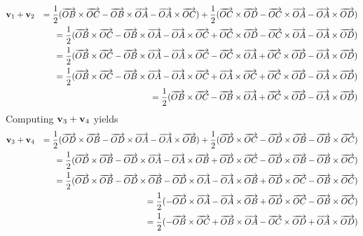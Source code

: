 \documentclass[12pt]{amsbook}
\begin{document}
\begin{eqnarray*}
{\bf v}_1+{\bf v}_2&&=\frac 12(\overrightarrow{OB}\times\overrightarrow{OC}-\overrightarrow{OB}\times\overrightarrow{OA}-\overrightarrow{OA}\times\overrightarrow{OC})+\frac 12(\overrightarrow{OC}\times\overrightarrow{OD}-\overrightarrow{OC}\times\overrightarrow{OA}-\overrightarrow{OA}\times\overrightarrow{OD})\\
&&=\frac 12(\overrightarrow{OB}\times\overrightarrow{OC}-\overrightarrow{OB}\times\overrightarrow{OA}-\overrightarrow{OA}\times\overrightarrow{OC}+\overrightarrow{OC}\times\overrightarrow{OD}-\overrightarrow{OC}\times\overrightarrow{OA}-\overrightarrow{OA}\times\overrightarrow{OD})\\
&&=\frac 12(\overrightarrow{OB}\times\overrightarrow{OC}-\overrightarrow{OB}\times\overrightarrow{OA}-\overrightarrow{OA}\times\overrightarrow{OC}-\overrightarrow{OC}\times\overrightarrow{OA}+\overrightarrow{OC}\times\overrightarrow{OD}-\overrightarrow{OA}\times\overrightarrow{OD})\\
&&=\frac 12(\overrightarrow{OB}\times\overrightarrow{OC}-\overrightarrow{OB}\times\overrightarrow{OA}-\overrightarrow{OA}\times\overrightarrow{OC}+\overrightarrow{OA}\times\overrightarrow{OC}+\overrightarrow{OC}\times\overrightarrow{OD}-\overrightarrow{OA}\times\overrightarrow{OD})\\
&&=\frac 12(\overrightarrow{OB}\times\overrightarrow{OC}-\overrightarrow{OB}\times\overrightarrow{OA}+\overrightarrow{OC}\times\overrightarrow{OD}-\overrightarrow{OA}\times\overrightarrow{OD})
\end{eqnarray*}
Computing ${\bf v}_3+{\bf v}_4$ yields
\begin{eqnarray*}
{\bf v}_3+{\bf v}_4&&=\frac 12(\overrightarrow{OD}\times\overrightarrow{OB}-\overrightarrow{OD}\times\overrightarrow{OA}-\overrightarrow{OA}\times\overrightarrow{OB})+\frac 12(\overrightarrow{OD}\times\overrightarrow{OC}-\overrightarrow{OD}\times\overrightarrow{OB}-\overrightarrow{OB}\times\overrightarrow{OC})\\
&&=\frac 12(\overrightarrow{OD}\times\overrightarrow{OB}-\overrightarrow{OD}\times\overrightarrow{OA}-\overrightarrow{OA}\times\overrightarrow{OB}+\overrightarrow{OD}\times\overrightarrow{OC}-\overrightarrow{OD}\times\overrightarrow{OB}-\overrightarrow{OB}\times\overrightarrow{OC})\\
&&=\frac 12(\overrightarrow{OD}\times\overrightarrow{OB}-\overrightarrow{OD}\times\overrightarrow{OB}-\overrightarrow{OD}\times\overrightarrow{OA}-\overrightarrow{OA}\times\overrightarrow{OB}+\overrightarrow{OD}\times\overrightarrow{OC}-\overrightarrow{OB}\times\overrightarrow{OC})\\
&&=\frac 12(-\overrightarrow{OD}\times\overrightarrow{OA}-\overrightarrow{OA}\times\overrightarrow{OB}+\overrightarrow{OD}\times\overrightarrow{OC}-\overrightarrow{OB}\times\overrightarrow{OC})\\
&&=\frac 12(-\overrightarrow{OB}\times\overrightarrow{OC}+\overrightarrow{OB}\times\overrightarrow{OA}-\overrightarrow{OC}\times\overrightarrow{OD}+\overrightarrow{OA}\times\overrightarrow{OD})\\
\end{eqnarray*}
\end{document}
